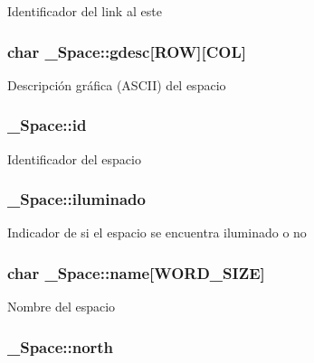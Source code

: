 Identificador del link al este \hypertarget{struct__Space_a2e0e2822b0391261395af37c2d12b4bf}{
\subsubsection[{gdesc}]{\setlength{\rightskip}{0pt plus 5cm}char \+\_\+\+Space\+::gdesc\mbox{[}R\+O\+W\mbox{]}\mbox{[}C\+O\+L\mbox{]}}}\label{struct__Space_a2e0e2822b0391261395af37c2d12b4bf}
Descripción gráfica (A\+S\+C\+I\+I) del espacio \hypertarget{struct__Space_a70cb461deb9ac073e401b607339b567f}{
\subsubsection[{id}]{ \+\_\+\+Space\+::id}}\label{struct__Space_a70cb461deb9ac073e401b607339b567f}
Identificador del espacio \hypertarget{struct__Space_a94562449709befaa54497c15b6256efc}{
\subsubsection[{iluminado}]{ \+\_\+\+Space\+::iluminado}}\label{struct__Space_a94562449709befaa54497c15b6256efc}
Indicador de si el espacio se encuentra iluminado o no \hypertarget{struct__Space_a4e8775f2ba9ae19392f9942dbb5f5ec0}{
\subsubsection[{name}]{\setlength{\rightskip}{0pt plus 5cm}char \+\_\+\+Space\+::name\mbox{[}{\bf W\+O\+R\+D\+\_\+\+S\+I\+Z\+E}\mbox{]}}}\label{struct__Space_a4e8775f2ba9ae19392f9942dbb5f5ec0}
Nombre del espacio \hypertarget{struct__Space_ae5ebe53ce79514d7d2d93911e0159252}{
\subsubsection[{north}]{ \+\_\+\+Space\+::north}}\label{struct__Space_ae5ebe53ce79514d7d2d93911e0159252}
